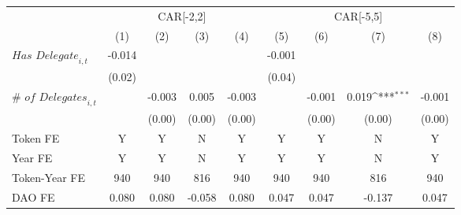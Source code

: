 {
\def\sym#1{\ifmmode^{#1}\else\(^{#1}\)\fi}
\begin{tabular}{l*{8}{c}}
\toprule
                    &\multicolumn{4}{c}{CAR[-2,2]}                                                          &\multicolumn{4}{c}{CAR[-5,5]}                                                          \\\cmidrule(lr){2-5}\cmidrule(lr){6-9}
                    &\multicolumn{1}{c}{(1)}         &\multicolumn{1}{c}{(2)}         &\multicolumn{1}{c}{(3)}         &\multicolumn{1}{c}{(4)}         &\multicolumn{1}{c}{(5)}         &\multicolumn{1}{c}{(6)}         &\multicolumn{1}{c}{(7)}         &\multicolumn{1}{c}{(8)}         \\
\midrule
$\textit{Has Delegate}_{i,t}$&      -0.014         &                     &                     &                     &      -0.001         &                     &                     &                     \\
                    &      (0.02)         &                     &                     &                     &      (0.04)         &                     &                     &                     \\
$\textit{# of Delegates}_{i,t}$&                     &      -0.003         &       0.005         &      -0.003         &                     &      -0.001         &       0.019\sym{***}&      -0.001         \\
                    &                     &      (0.00)         &      (0.00)         &      (0.00)         &                     &      (0.00)         &      (0.00)         &      (0.00)         \\
\midrule
Token FE            &           Y         &           Y         &           N         &           Y         &           Y         &           Y         &           N         &           Y         \\
Year FE             &           Y         &           Y         &           N         &           Y         &           Y         &           Y         &           N         &           Y         \\
Token-Year FE       &         940         &         940         &         816         &         940         &         940         &         940         &         816         &         940         \\
DAO FE              &       0.080         &       0.080         &      -0.058         &       0.080         &       0.047         &       0.047         &      -0.137         &       0.047         \\
\bottomrule
\end{tabular}
}
